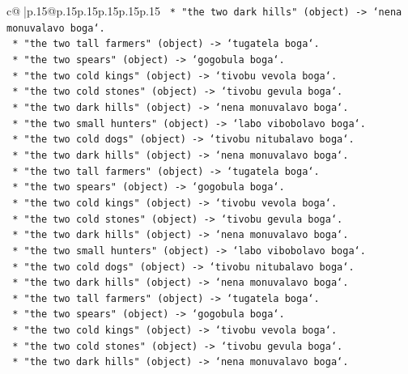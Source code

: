 \documentclass{article}
\begin{document}
{\begin{supertabular}{c@{$\;$}|p{.15\linewidth}@{}p{.15\linewidth}p{.15\linewidth}p{.15\linewidth}p{.15\linewidth}p{.15\linewidth}}
{{{\texttt{        *   "the two dark hills" (object) {-}> `nena monuvalavo boga`.} \\
\texttt{        *   "the two tall farmers" (object) {-}> `tugatela boga`.} \\
\texttt{        *   "the two spears" (object) {-}> `gogobula boga`.} \\
\texttt{        *   "the two cold kings" (object) {-}> `tivobu vevola boga`.} \\
\texttt{        *   "the two cold stones" (object) {-}> `tivobu gevula boga`.} \\
\texttt{        *   "the two dark hills" (object) {-}> `nena monuvalavo boga`.} \\
\texttt{        *   "the two small hunters" (object) {-}> `labo vibobolavo boga`.} \\
\texttt{        *   "the two cold dogs" (object) {-}> `tivobu nitubalavo boga`.} \\
\texttt{        *   "the two dark hills" (object) {-}> `nena monuvalavo boga`.} \\
\texttt{        *   "the two tall farmers" (object) {-}> `tugatela boga`.} \\
\texttt{        *   "the two spears" (object) {-}> `gogobula boga`.} \\
\texttt{        *   "the two cold kings" (object) {-}> `tivobu vevola boga`.} \\
\texttt{        *   "the two cold stones" (object) {-}> `tivobu gevula boga`.} \\
\texttt{        *   "the two dark hills" (object) {-}> `nena monuvalavo boga`.} \\
\texttt{        *   "the two small hunters" (object) {-}> `labo vibobolavo boga`.} \\
\texttt{        *   "the two cold dogs" (object) {-}> `tivobu nitubalavo boga`.} \\
\texttt{        *   "the two dark hills" (object) {-}> `nena monuvalavo boga`.} \\
\texttt{        *   "the two tall farmers" (object) {-}> `tugatela boga`.} \\
\texttt{        *   "the two spears" (object) {-}> `gogobula boga`.} \\
\texttt{        *   "the two cold kings" (object) {-}> `tivobu vevola boga`.} \\
\texttt{        *   "the two cold stones" (object) {-}> `tivobu gevula boga`.} \\
\texttt{        *   "the two dark hills" (object) {-}> `nena monuvalavo boga`.} \\
}}}
\end{supertabular}}
\end{document}
